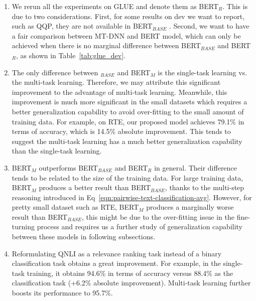 \begin{enumerate}
\item We rerun all the experiments on GLUE and denote them as BERT$_R$. This is due to two considerations. First, for some results on dev we want to report, such as QQP,  they are not available in BERT$_{BASE}$ \cite{bert2018}. Second, we want to have a fair comparison between MT-DNN and BERT model,  which can only be achieved when there is no marginal difference between BERT$_{BASE}$ and BERT$_R$, as shown in Table~\ref{tab:glue_dev}. 

\item The only difference between \MNAME$_{BASE}$ and BERT$_{M}$ is the single-task learning vs. the multi-task learning.  Therefore, we may attribute this significant improvement to the advantage of multi-task learning. Meanwhile, this improvement is much more significant in the small datasets which requires a better generalization capability to avoid over-fitting to the small amount of training data.  For example, on RTE, our proposed model achieves 79.1\% in terms of accuracy, which is 14.5\% absolute improvement. This tends to suggest the multi-task learning has a much better generalization capability than the single-task learning.   

\item BERT$_M$ outperforms BERT$_{BASE}$ and BERT$_{R}$ in general. Their difference tends to be related to the size of the training data. For large training data, BERT$_M$ produces a better result than BERT$_{BASE}$, thanks to the multi-step reasoning introduced in Eq~\ref{eqn:pairwise-text-classification-avg}. However, for pretty small dataset such as RTE,  BERT$_{M}$ produces a marginally worse result than BERT$_{BASE}$,  this might be due to the over-fitting issue in the fine-turning process and requires us a further study of generalization capability between these models in following subsections. 

\item Reformulating QNLI as a relevance ranking task instead of a binary classification task obtains a great improvement. For example, in the single-task training, it obtains 94.6\% in terms of accuracy versus 88.4\% as the classification task (+6.2\% absolute improvement). Multi-task learning further boosts its performance to 95.7\%. 
\end{enumerate}

